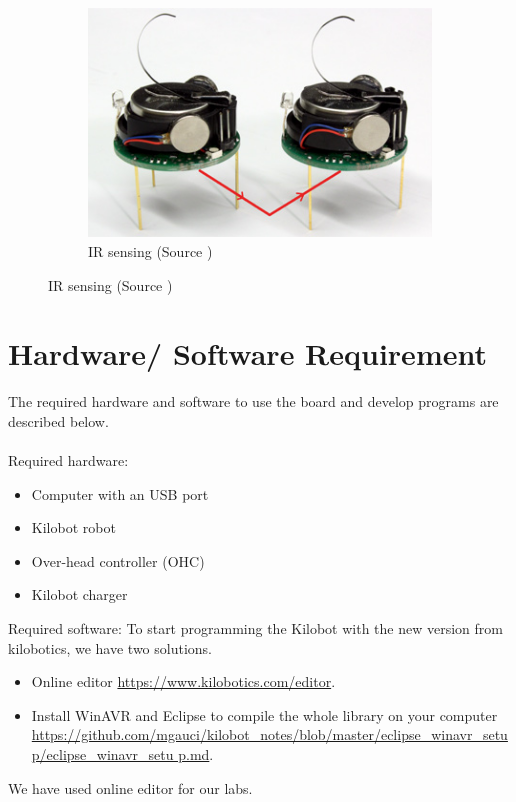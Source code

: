 \documentclass{report}[12pt]
\begin{document}
\begin{figure}[H]
\begin{subfigure}{0.45\textwidth}
		\label{fig:kilobot}
	\end{subfigure}
	\begin{subfigure}{0.45\textwidth}
		\centering
		\includegraphics[scale=0.5]{images/comm}
		\caption{IR sensing (Source \cite{kilobotics_manual})}
        \label{fig:comm}
	\end{subfigure}
\end{figure}

\section{Hardware/ Software Requirement}
The required hardware and software to use the board and develop programs are described below.\\\\
Required hardware:
\begin{itemize}
\item Computer with an USB port
\item Kilobot robot
\item Over-head controller (OHC)
\item Kilobot charger
\end{itemize}

\noindent Required software:
To start programming the Kilobot with the new version from kilobotics, we  have two solutions.
\begin{itemize}
\item Online editor \url{https://www.kilobotics.com/editor}.
\item Install WinAVR and Eclipse to compile the whole library on your computer \url{https://github.com/mgauci/kilobot_notes/blob/master/eclipse_winavr_setup/eclipse_winavr_setu
p.md}. 
\end{itemize}
We have used online editor for our labs. 
\end{document}
